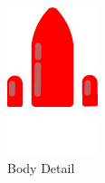 \begin{figure}[!htb]
%
  \includegraphics[width=\linewidth]{chapters/modding/shipBody.png}
  \caption*{Body Detail}
\endminipage\hfill
{}%

\end{figure}
